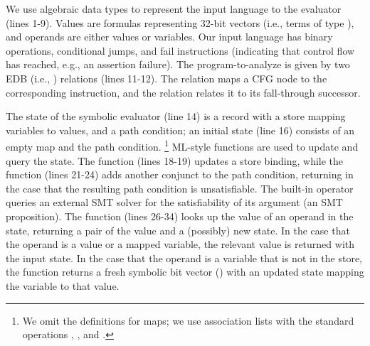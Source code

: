 \documentclass[acmsmall,screen,nonacm]{acmart}
\theoremstyle{definition}
\begin{document}
We use algebraic data types to represent the input language to the evaluator
(lines 1-9).
Values are formulas representing 32-bit vectors (i.e., terms of type ), and operands are either values or variables.
Our input language has binary operations, conditional jumps, and fail
instructions (indicating that control flow has reached, e.g., an assertion
failure).
The program-to-analyze is given by two EDB (i.e., ) relations (lines 11-12).
The relation  maps a CFG node to the corresponding
instruction, and the relation  relates it to its fall-through
successor.

The state of the symbolic evaluator (line 14) is a record with a store mapping
variables to values, and a path condition; an initial state (line 16) consists
of an empty map and the  path condition.%
\footnote{We omit the definitions for maps; we use association lists with the
standard operations , , and .}
ML-style functions are used to update and query the state.
The function  (lines 18-19) updates a store binding, while the
function  (lines 21-24) adds another conjunct to the path
condition, returning  in the case that the resulting path condition is
unsatisfiable.
The built-in operator  queries an external SMT solver for the
satisfiability of its argument (an SMT proposition).
The function  (lines 26-34) looks up the value of an operand in the
state, returning a pair of the value and a (possibly) new state.
In the case that the operand is a value or a mapped variable, the relevant
value is returned with the input state.
In the case that the operand is a variable that is not in the store, the
function returns a fresh symbolic bit vector () with an
updated state mapping the variable to that value.
\end{document}
